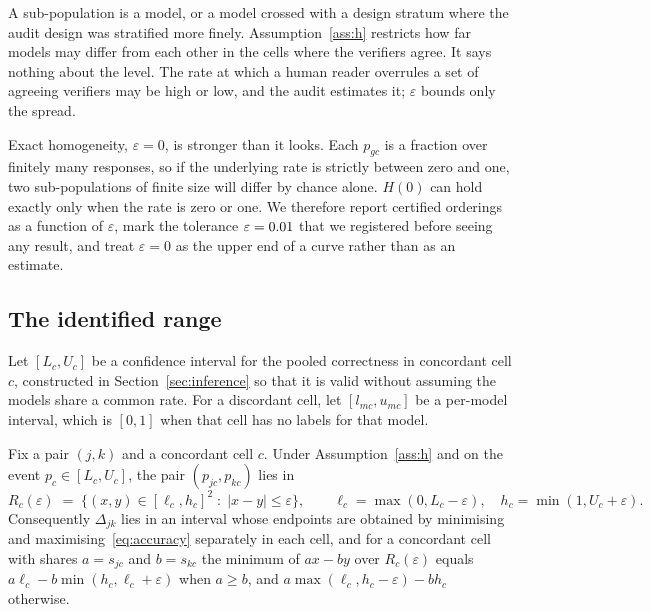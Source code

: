 A sub-population is a model, or a model crossed with a design stratum where the audit design
was stratified more finely. Assumption~\ref{ass:h} restricts how far models may differ from
each other in the cells where the verifiers agree. It says nothing about the level. The
rate at which a human reader overrules a set of agreeing verifiers may be high or low, and the
audit estimates it; $\varepsilon$ bounds only the spread.

Exact homogeneity, $\varepsilon = 0$, is stronger than it looks. Each $p_{gc}$ is a fraction
over finitely many responses, so if the underlying rate is strictly between zero and one, two
sub-populations of finite size will differ by chance alone. $H(0)$ can hold exactly only when
the rate is zero or one. We therefore report certified orderings as a function of
$\varepsilon$, mark the tolerance $\varepsilon = 0.01$ that we registered before seeing
any result, and treat $\varepsilon = 0$ as the upper end of a curve rather than as an estimate.

\subsection{The identified range}

Let $[L_c, U_c]$ be a confidence interval for the pooled correctness in concordant cell $c$,
constructed in Section~\ref{sec:inference} so that it is valid without assuming the models
share a common rate. For a discordant cell, let $[l_{mc}, u_{mc}]$ be a per-model interval,
which is $[0,1]$ when that cell has no labels for that model.

\begin{proposition}
\label{prop:range}
Fix a pair $(j,k)$ and a concordant cell $c$. Under Assumption~\ref{ass:h} and on the event
$p_{c} \in [L_c, U_c]$, the pair $(p_{jc}, p_{kc})$ lies in
\[
R_c(\varepsilon) \;=\; \bigl\{ (x,y) \in [\ell_c, h_c]^2 \;:\; |x - y| \le \varepsilon \bigr\},
\qquad \ell_c = \max(0, L_c - \varepsilon), \quad h_c = \min(1, U_c + \varepsilon).
\]
Consequently $\Delta_{jk}$ lies in an interval whose endpoints are obtained by minimising and
maximising~\eqref{eq:accuracy} separately in each cell, and for a concordant cell with shares
$a = s_{jc}$ and $b = s_{kc}$ the minimum of $a x - b y$ over $R_c(\varepsilon)$ equals
$a\ell_c - b\min(h_c, \ell_c + \varepsilon)$ when $a \ge b$, and
$a\max(\ell_c, h_c - \varepsilon) - b h_c$ otherwise.
\end{proposition}

